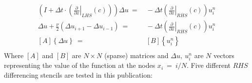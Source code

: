 \documentclass[conf]{new-aiaa}
\begin{document}
\begin{equation}
	\begin{split}
		\label{eq:LAE}
  			\left(I+\Delta{t}\cdot\left(\left.\frac{\partial}{\partial{x}}\right|_{LHS}\left(c\right)\right)\right)\Delta{u}~=&~-\Delta{t}\left(\left.\frac{\partial}{\partial{x}}\right|_{RHS}\left(c\right)\right) {u}_i^{n} \\
  			\Delta{u}+\frac{\nu}{2}\left(\Delta{u_{i+1}}-\Delta{u_{i-1}} \right)~=&~-\Delta{t}\left(\left.\frac{\partial}{\partial{x}}\right|_{RHS}\left(c\right)\right) {u}_i^{n} \\
  			\left[A\right]\left\{\Delta{u}\right\}~=&~\left[B\right]\left\{u_{i}^{n}\right\} \\
	\end{split}
\end{equation}
Where $[A]$ and $[B]$ are $N\times{N}$ (sparse) matrices and $\Delta{u},~u_{i}^{n}$ are $N$ vectors representing the value of the function at the nodes $x_i~=~i/N$.
Five different $RHS$ differencing stencils are tested in this publication:
\end{document}
